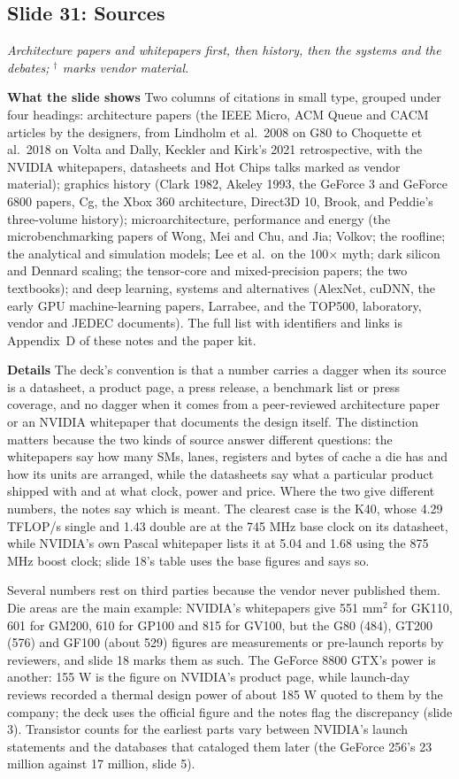 \documentclass[11pt,letterpaper]{article}
\newcommand{\slide}[3]{%
  \subsection[Slide #1: #2]{Slide #1: #2}%
  {\color{muted}\itshape #3\par}\medskip}
\newcommand{\para}[1]{\medskip\noindent\textbf{#1}\quad}
\begin{document}
\slide{31}{Sources}{Architecture papers and whitepapers first, then history, then the systems and the debates; $^\dagger$ marks vendor material.}

\para{What the slide shows} Two columns of citations in small type, grouped under four headings: architecture papers (the IEEE Micro, ACM Queue and CACM articles by the designers, from Lindholm et al.\ 2008 on G80 to Choquette et al.\ 2018 on Volta and Dally, Keckler and Kirk's 2021 retrospective, with the NVIDIA whitepapers, datasheets and Hot Chips talks marked as vendor material); graphics history (Clark 1982, Akeley 1993, the GeForce 3 and GeForce 6800 papers, Cg, the Xbox 360 architecture, Direct3D 10, Brook, and Peddie's three-volume history); microarchitecture, performance and energy (the microbenchmarking papers of Wong, Mei and Chu, and Jia; Volkov; the roofline; the analytical and simulation models; Lee et al.\ on the 100$\times$ myth; dark silicon and Dennard scaling; the tensor-core and mixed-precision papers; the two textbooks); and deep learning, systems and alternatives (AlexNet, cuDNN, the early GPU machine-learning papers, Larrabee, and the TOP500, laboratory, vendor and JEDEC documents). The full list with identifiers and links is Appendix~D of these notes and the paper kit.

\para{Details} The deck's convention is that a number carries a dagger when its source is a datasheet, a product page, a press release, a benchmark list or press coverage, and no dagger when it comes from a peer-reviewed architecture paper or an NVIDIA whitepaper that documents the design itself. The distinction matters because the two kinds of source answer different questions: the whitepapers say how many SMs, lanes, registers and bytes of cache a die has and how its units are arranged, while the datasheets say what a particular product shipped with and at what clock, power and price. Where the two give different numbers, the notes say which is meant. The clearest case is the K40, whose 4.29 TFLOP/s single and 1.43 double are at the 745 MHz base clock on its datasheet, while NVIDIA's own Pascal whitepaper lists it at 5.04 and 1.68 using the 875 MHz boost clock; slide 18's table uses the base figures and says so.

Several numbers rest on third parties because the vendor never published them. Die areas are the main example: NVIDIA's whitepapers give 551 mm$^2$ for GK110, 601 for GM200, 610 for GP100 and 815 for GV100, but the G80 (484), GT200 (576) and GF100 (about 529) figures are measurements or pre-launch reports by reviewers, and slide 18 marks them as such. The GeForce 8800 GTX's power is another: 155 W is the figure on NVIDIA's product page, while launch-day reviews recorded a thermal design power of about 185 W quoted to them by the company; the deck uses the official figure and the notes flag the discrepancy (slide 3). Transistor counts for the earliest parts vary between NVIDIA's launch statements and the databases that cataloged them later (the GeForce 256's 23 million against 17 million, slide 5).
\end{document}
